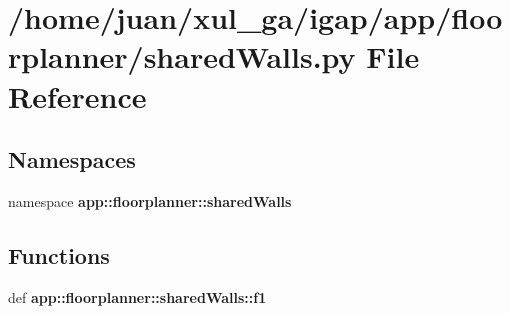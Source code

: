 \section{/home/juan/xul\_\-ga/igap/app/floorplanner/sharedWalls.py File Reference}
\label{sharedWalls_8py}
\subsection*{Namespaces}
\begin{CompactItemize}
\item 
namespace {\bf app::floorplanner::sharedWalls}
\end{CompactItemize}
\subsection*{Functions}
\begin{CompactItemize}
\item 
def {\bf app::floorplanner::sharedWalls::f1}
\end{CompactItemize}
